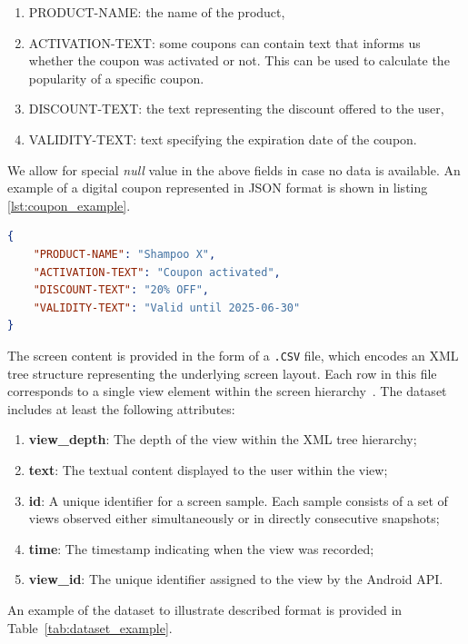 \documentclass[licencjacka,en]{pracamgr}
\begin{document}
\begin{enumerate}
    \item PRODUCT-NAME: the name of the product,
       \item ACTIVATION-TEXT: some coupons can contain text that informs us whether the coupon was activated or not.
        This can be used to calculate the popularity of a specific coupon.
    \item DISCOUNT-TEXT: the text representing the discount offered to the user,
    \item VALIDITY-TEXT: text specifying the expiration date of the coupon.
\end{enumerate}
We allow for special \textit{null} value in the above fields in case no data is available. An example of a digital coupon represented in JSON format is shown in listing \ref{lst:coupon_example}.

\begin{lstlisting}[language=json, caption={Example of a digital coupon in JSON format}, label={lst:coupon_example}]
{
    "PRODUCT-NAME": "Shampoo X",
    "ACTIVATION-TEXT": "Coupon activated",
    "DISCOUNT-TEXT": "20% OFF",
    "VALIDITY-TEXT": "Valid until 2025-06-30"
}
\end{lstlisting}

The screen content is provided in the form of a \texttt{.CSV} file, which encodes an XML tree structure representing the underlying screen layout. Each row in this file corresponds to a single view element within the screen hierarchy~\cite{android_view}. The dataset includes at least the following attributes:  

\begin{enumerate}
    \item \textbf{view\_depth}: The depth of the view within the XML tree hierarchy;
    \item \textbf{text}: The textual content displayed to the user within the view;
    \item \textbf{id}: A unique identifier for a screen sample. Each sample consists of a set of views observed either simultaneously or in directly consecutive snapshots;
    \item \textbf{time}: The timestamp indicating when the view was recorded;
    \item \textbf{view\_id}: The unique identifier assigned to the view by the Android API.
\end{enumerate}

An example of the dataset to illustrate described format is provided in Table~\ref{tab:dataset_example}.
\end{document}
